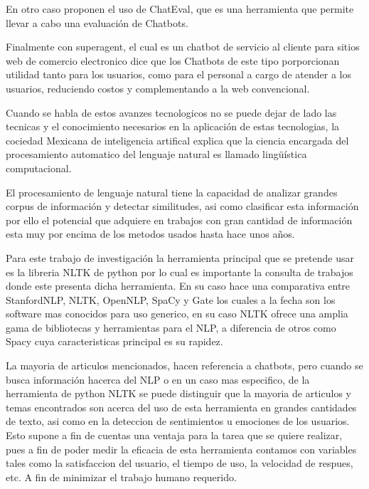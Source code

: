 En otro caso \citet{sedoc-etal-2019-chateval} proponen el uso de ChatEval, que es una herramienta que permite llevar a cabo una evaluación de Chatbots.

Finalmente \citet{cui2017superagent} con superagent, el cual es un chatbot de servicio al cliente para sitios web de comercio electronico dice que los Chatbots de este tipo porporcionan utilidad tanto para los usuarios, como para el personal a cargo de atender a los usuarios, reduciendo costos y complementando a la web convencional.

Cuando se habla de estos avanzes tecnologicos no se puede dejar de lado las tecnicas y el conocimiento necesarios en la aplicación de estas tecnologias, la cociedad Mexicana de inteligencia artifical explica que la ciencia encargada del procesamiento automatico del lenguaje natural es llamado lingüística computacional\citep{gelbukh2018procesamiento}.

El procesamiento de lenguaje natural tiene la capacidad de analizar grandes corpus de información y detectar similitudes, asi como clasificar esta información\cite{sancho2020aplicacion,miranda2022mention} por ello el potencial que adquiere en trabajos con gran cantidad de información esta muy por encima de los metodos usados hasta hace unos años.

Para este trabajo de investigación la herramienta principal que se pretende usar es la libreria NLTK de python por lo cual es importante la consulta de trabajos donde este presenta dicha herramienta. En su caso \citet{schmitt2019replicable} hace una comparativa entre StanfordNLP, NLTK, OpenNLP, SpaCy y Gate los cuales a la fecha son los software mas conocidos para uso generico, en su caso NLTK ofrece una amplia gama de bibliotecas y herramientas para el NLP, a diferencia de otros como Spacy cuya caracteristicas principal es su rapidez.

La mayoria de articulos mencionados, hacen referencia a chatbots, pero cuando se busca información hacerca del NLP o en un caso mas especifico, de la herramienta de python NLTK se puede distinguir que la mayoria de articulos y temas encontrados son acerca del uso de esta herramienta en grandes cantidades de texto, asi como en la deteccion de sentimientos u emociones de los usuarios. Esto supone a fin de cuentas una ventaja para la tarea que se quiere realizar, pues a fin de poder medir la eficacia de esta herramienta contamos con variables tales como la satisfaccion del usuario, el tiempo de uso, la velocidad de respues, etc. A fin de minimizar el trabajo humano requerido\citep{wang2021application}.